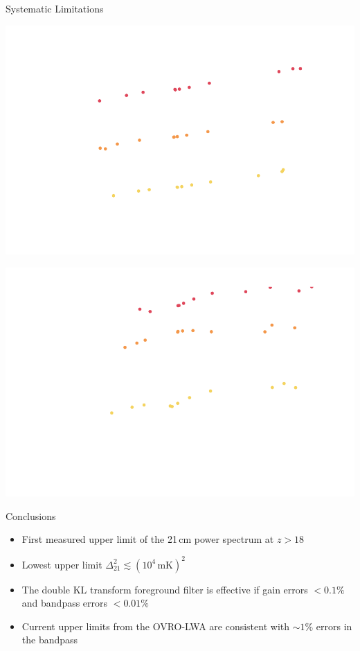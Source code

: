 \documentclass{beamer}
\begin{document}
\begin{frame}{Systematic Limitations}
\begin{overprint}
\begin{center}
            \includegraphics[height=0.75\textheight]{figures/spherical-power-spectra/spherical-power-spectrum-gain-errors-3.pdf}
        \end{center}
        \begin{center}
            \includegraphics[height=0.75\textheight]{figures/spherical-power-spectra/spherical-power-spectrum-bandpass-errors.pdf}
        \end{center}
    \end{overprint}
\end{frame}

\begin{frame}{Conclusions}
    \begin{itemize}[label=\textbullet]
        \item
            First measured upper limit of the 21\,cm power spectrum at $z > 18$
        \item
            Lowest upper limit $\Delta_{21}^2 \lesssim (10^4\,\textrm{mK})^2$
        \item
            The double KL transform foreground filter is effective if gain errors $<0.1\%$ and
            bandpass errors $<0.01\%$
        \item
            Current upper limits from the OVRO-LWA are consistent with $\sim 1\%$ errors in the
            bandpass
    \end{itemize}
\end{frame}
\end{document}
